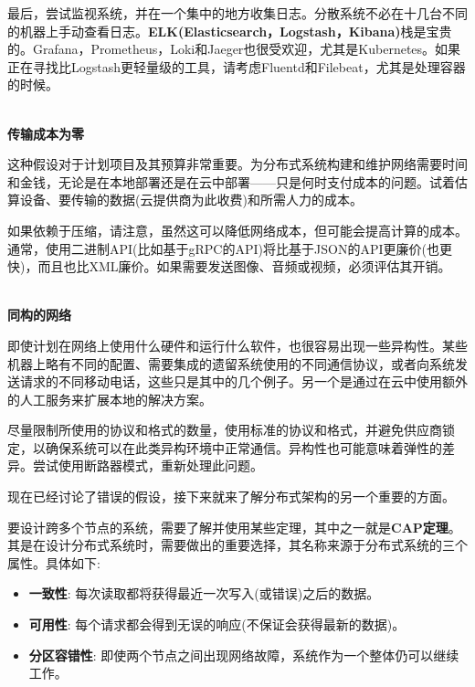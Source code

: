 最后，尝试监视系统，并在一个集中的地方收集日志。分散系统不必在十几台不同的机器上手动查看日志。\textbf{ELK(Elasticsearch，Logstash，Kibana)}栈是宝贵的。Grafana，Prometheus，Loki和Jaeger也很受欢迎，尤其是Kubernetes。如果正在寻找比Logstash更轻量级的工具，请考虑Fluentd和Filebeat，尤其是处理容器的时候。

\hspace*{\fill} \\ %
\noindent
\textbf{传输成本为零}

这种假设对于计划项目及其预算非常重要。为分布式系统构建和维护网络需要时间和金钱，无论是在本地部署还是在云中部署——只是何时支付成本的问题。试着估算设备、要传输的数据(云提供商为此收费)和所需人力的成本。

如果依赖于压缩，请注意，虽然这可以降低网络成本，但可能会提高计算的成本。通常，使用二进制API(比如基于gRPC的API)将比基于JSON的API更廉价(也更快)，而且也比XML廉价。如果需要发送图像、音频或视频，必须评估其开销。

\hspace*{\fill} \\ %
\noindent
\textbf{同构的网络}

即使计划在网络上使用什么硬件和运行什么软件，也很容易出现一些异构性。某些机器上略有不同的配置、需要集成的遗留系统使用的不同通信协议，或者向系统发送请求的不同移动电话，这些只是其中的几个例子。另一个是通过在云中使用额外的人工服务来扩展本地的解决方案。

尽量限制所使用的协议和格式的数量，使用标准的协议和格式，并避免供应商锁定，以确保系统可以在此类异构环境中正常通信。异构性也可能意味着弹性的差异。尝试使用断路器模式，重新处理此问题。

现在已经讨论了错误的假设，接下来就来了解分布式架构的另一个重要的方面。


要设计跨多个节点的系统，需要了解并使用某些定理，其中之一就是\textbf{CAP定理}。其是在设计分布式系统时，需要做出的重要选择，其名称来源于分布式系统的三个属性。具体如下:

\begin{itemize}
\item 
\textbf{一致性}: 每次读取都将获得最近一次写入(或错误)之后的数据。

\item 
\textbf{可用性}: 每个请求都会得到无误的响应(不保证会获得最新的数据)。

\item 
\textbf{分区容错性}: 即使两个节点之间出现网络故障，系统作为一个整体仍可以继续工作。
\end{itemize}

